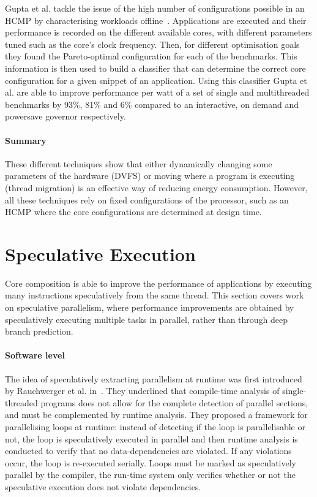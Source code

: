 Gupta et al. tackle the issue of the high number of configurations possible in an HCMP by characterising workloads offline~\cite{Gupta2017Dypo}.
Applications are executed and their performance is recorded on the different available cores, with different parameters tuned such as the core's clock frequency.
Then, for different optimisation goals they found the Pareto-optimal configuration for each of the benchmarks.
This information is then used to build a classifier that can determine the correct core configuration for a given snippet of an application.
Using this classifier Gupta et al. are able to improve performance per watt of a set of single and multithreaded benchmarks by 93\%, 81\% and 6\% compared to an interactive, on demand and powersave governor respectively.

\paragraph*{Summary}
These different techniques show that either dynamically changing some parameters of the hardware (DVFS) or moving where a program is executing (thread migration) is an effective way of reducing energy consumption.
However, all these techniques rely on fixed configurations of the processor, such as an HCMP where the core configurations are determined at design time. 
\vspace{-1em}
\section{Speculative Execution}
Core composition is able to improve the performance of applications by executing many instructions speculatively from the same thread.
This section covers work on speculative parallelism, where performance improvements are obtained by speculatively executing multiple tasks in parallel, rather than through deep branch prediction.

\paragraph*{Software level}
The idea of speculatively extracting parallelism at runtime was first introduced by Rauchwerger et al. in~\cite{runtimeSpec}.
They underlined that compile-time analysis of single-threaded programs does not allow for the complete detection of parallel sections, and must be complemented by runtime analysis.
They proposed a framework for parallelising loops at runtime: instead of detecting if the loop is parallelisable or not, the loop is speculatively executed in parallel and then runtime analysis is conducted to verify that no data-dependencies are violated.
If any violations occur, the loop is re-executed serially.
Loops must be marked as speculatively parallel by the compiler, the run-time system only verifies whether or not the speculative execution does not violate dependencies.

